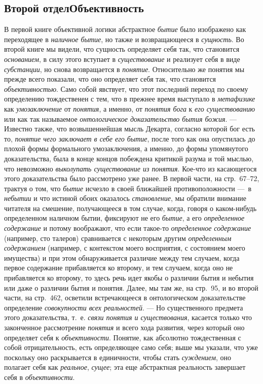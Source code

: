 \documentclass[twoside]{article}
\begin{document}
{{{{{{\clearpage\subsection[Второй отдел Объективность]{Второй отдел\newline Объективность}
В первой книге объективной логики абстрактное
{\em бытие} было
изображено как переходящее в
{\em наличное бытие}, но
также и возвращающееся в
{\em сущность}. Во второй
книге мы видели, что сущность определяет себя так, что становится
{\em основанием}, в силу
этого вступает в {\em существование}
и реализует себя в виде
{\em субстанции}, но
снова возвращается в {\em понятие}.
Относительно же понятия мы прежде всего показали, что оно
определяет себя так, что становится
{\em объективностью}.
Само собой явствует, что этот последний переход по своему
определению тождественен с тем, что в прежнее время выступало в
{\em метафизике} как
{\em умозаключение} от
{\em понятия}, а именно,
от {\em понятия бога} к
{\em его существованию}
или как так называемое
{\em онтологическое доказательство бытия
божия}. — Известно также, что возвышеннейшая мысль Декарта,
согласно которой бог есть то,
{\em понятие чего заключает в себе его
бытие}, после того как она опустилась до плохой формы
формального умозаключения, а именно, до формы упомянутого доказательства,
была в конце концов побеждена критикой разума и той мыслью, что невозможно
{\em выколупать существование из
понятия}. Кое-что из касающегося этого доказательства было
рассмотрено уже ранее. В первой части, на стр.~67–72, трактуя о том, что
{\em бытие} исчезло в
своей ближайшей противоположности —~в
{\em небытии} и что
истиной обоих оказалось
{\em становление}, мы
обратили внимание читателя на смешение, получающееся в том случае, когда,
говоря о каком-нибудь определенном наличном бытии, фиксируют не его
{\em бытие}, а его
{\em определенное содержание}
и потому воображают, что если такое-то
{\em определенное содержание}
(например, сто талеров) сравнивается с некоторым другим
{\em определенным содержанием}
(например, с контекстом моего восприятия, с состоянием моего
имущества) и при этом обнаруживается различие между тем случаем, когда
первое содержание прибавляется ко второму, и тем случаем, когда оно не
прибавляется ко второму, то здесь речь идет якобы о различии бытия и
небытия или даже о различии бытия и понятия. Далее, мы там же, на стр.~95,
и во второй части, на стр.~462, осветили встречающееся в онтологическом
доказательстве определение
{\em совокупности всех реальностей}. —
Но существенного предмета этого доказательства, т.~е.
{\em связи понятия и существования},
касается только что законченное рассмотрение
{\em понятия} и всего
хода развития, через который оно определяет себя к
{\em объективности}.
Понятие, как абсолютно тождественная с собой отрицательность,
есть определяющее само себя; выше мы указали, что уже поскольку оно
раскрывается в единичности, чтобы стать
{\em суждением}, оно
полагает себя как {\em реальное},
{\em сущее}; эта еще
абстрактная реальность завершает себя в
{\em объективности}.

}}}}}}
\end{document}
